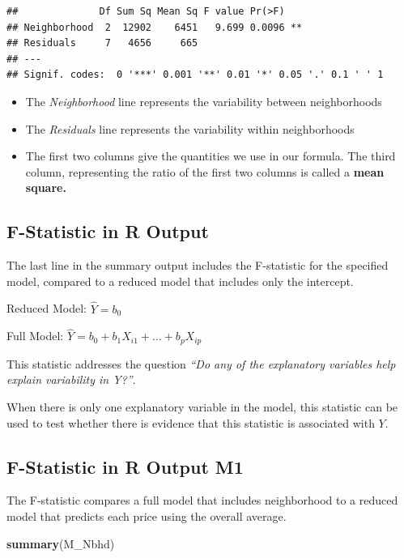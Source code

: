 \documentclass[]{book}
\newenvironment{Shaded}{\begin{snugshade}}{\end{snugshade}}
\newcommand{\KeywordTok}[1]{\textcolor[rgb]{0.13,0.29,0.53}{\textbf{#1}}}
\newcommand{\NormalTok}[1]{#1}
\begin{document}
\begin{verbatim}
##              Df Sum Sq Mean Sq F value Pr(>F)   
## Neighborhood  2  12902    6451   9.699 0.0096 **
## Residuals     7   4656     665                  
## ---
## Signif. codes:  0 '***' 0.001 '**' 0.01 '*' 0.05 '.' 0.1 ' ' 1
\end{verbatim}

\begin{itemize}
\item
  The \emph{Neighborhood} line represents the variability between
  neighborhoods\\
\item
  The \emph{Residuals} line represents the variability within
  neighborhoods
\item
  The first two columns give the quantities we use in our formula. The
  third column, representing the ratio of the first two columns is
  called a \textbf{mean square.}
\end{itemize}

\subsection{F-Statistic in R Output}\label{f-statistic-in-r-output}

The last line in the summary output includes the F-statistic for the
specified model, compared to a reduced model that includes only the
intercept.

Reduced Model: \(\widehat{Y}= b_0\)

Full Model: \(\widehat{Y}= b_0+ b_1 X_{i1}+ \ldots+ b_p X_{ip}\)

This statistic addresses the question \emph{``Do any of the explanatory
variables help explain variability in Y?''}.

When there is only one explanatory variable in the model, this statistic
can be used to test whether there is evidence that this statistic is
associated with \(Y\).

\subsection{F-Statistic in R Output
M1}\label{f-statistic-in-r-output-m1}

The F-statistic compares a full model that includes neighborhood to a
reduced model that predicts each price using the overall average.

\begin{Shaded}
\begin{Highlighting}[]
\KeywordTok{summary}\NormalTok{(M_Nbhd)}
\end{Highlighting}
\end{Shaded}
\end{document}
